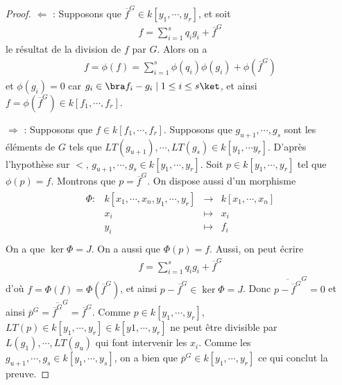         \begin{proof}
            \item $\Leftarrow$ : Supposons que $\overline{f}^G \in k[y_1, \cdots, y_r]$, et soit 
            \begin{align*}
                f = \sum_{i = 1}^s q_ig_i + \overline{f}^G
            \end{align*} 
            le résultat de la division de $f$ par $G$. Alors on a
            \begin{align*}
                f = \phi(f) = \sum_{i = 1}^s \phi(q_i)\phi(g_i) + \phi(\overline{f}^G)
            \end{align*}
            et $\phi(g_i) = 0$ car $g_i \in \bra f_i - g_i \mid 1 \leq i \leq s \ket$, et ainsi $f = \phi(\overline{f}^G) \in k[f_1, \cdots, f_r]$.
            \item $\Rightarrow$ : Supposons que $f \in k[f_1, \cdots, f_r]$. Supposons que $g_{u+1}, \cdots, g_s$ sont les éléments de $G$ tels que $LT(g_{u+1}), \cdots, LT(g_s) \in k[y_1, \cdots y_r]$. D'après l'hypothèse sur $<$, $g_{u+1}, \cdots, g_s \in k[y_1, \cdots, y_r]$. Soit $p \in k[y_1, \cdots, y_r]$ tel que $\phi(p) = f$. Montrons que $p = \overline{f}^G$. On dispose aussi d'un morphisme
            \begin{align*}
                \begin{array}{cccc}
                    \Phi : & k[x_1, \cdots, x_n, y_1, \cdots, y_r] & \to & k[x_1, \cdots, x_n] \\
                    & x_i & \mapsto & x_i \\
                    & y_i & \mapsto & f_i \\
                \end{array}
            \end{align*}
            On a que $\ker \Phi = J$. On a aussi que $\Phi(p) = f$. Aussi, on peut écrire
            \begin{align*}
                f = \sum_{i = 1}^s q_ig_i + \overline{f}^G
            \end{align*}
            d'où $f = \Phi(f) = \Phi(\overline{f}^G)$, et ainsi $p - \overline{f}^G \in \ker \Phi = J$. Donc $\overline{p - \overline{f}^G}^G = 0$ et ainsi $\overline{p}^G = \overline{\overline{f}^G}^G = \overline{f}^G$. Comme $p \in k[y_1, \cdots, y_r]$, $LT(p) \in k[y_1, \cdots, y_r] \in k[y1, \cdots, y_r]$ ne peut être divisible par $L(g_1), \cdots, LT(g_u)$ qui font intervenir les $x_i$. Comme les $g_{u + 1}, \cdots, g_s \in k[y_1, \cdots, y_s]$, on a bien que $\overline{p}^G \in k[y_1, \cdots, y_r]$ ce qui conclut la preuve.
        \end{proof}
